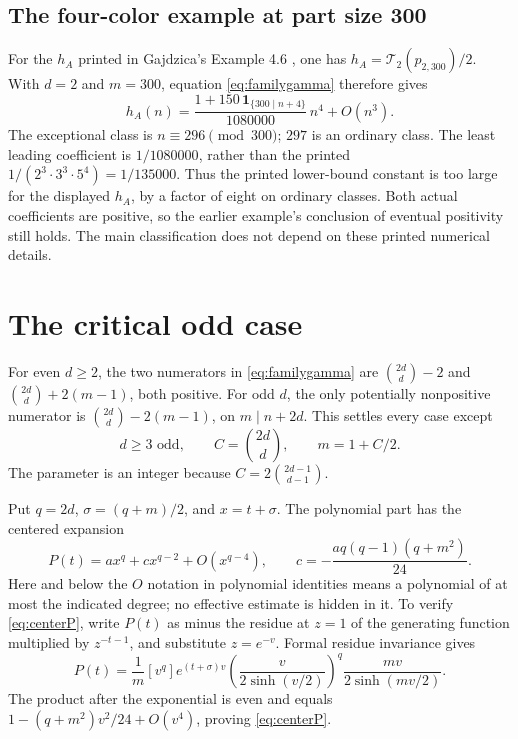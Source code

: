 \documentclass[11pt,reqno]{amsart}
\theoremstyle{remark}
\newcommand{\Lag}{\mathcal{T}}
\newcommand{\ind}{\mathbf{1}}
\begin{document}
\subsection{The four-color example at part size 300}\label{sec:example46}

For the \(h_A\) printed in Gajdzica's Example 4.6
\cite[Example 4.6]{Gajdzica_2024}, one has \(h_A=\Lag_2(p_{2,300})/2\).
With \(d=2\) and \(m=300\), equation \eqref{eq:familygamma} therefore gives
\[
 h_A(n)=
 \frac{1+150\,\ind_{\{300\mid n+4\}}}{1080000}\,n^4+O(n^3).
\]
The exceptional class is \(n\equiv296\pmod{300}\); \(297\) is an
ordinary class. The least leading coefficient is \(1/1080000\),
rather than the printed \(1/(2^3\cdot3^3\cdot5^4)=1/135000\).
Thus the printed lower-bound constant is too large for the displayed
\(h_A\), by a factor of eight on ordinary classes. Both actual
coefficients are positive, so the earlier example's conclusion of
eventual positivity still holds. The main classification does not
depend on these printed numerical details.

\section{The critical odd case}\label{sec:critical}

For even \(d\ge2\), the two numerators in \eqref{eq:familygamma} are
\(\binom{2d}{d}-2\) and \(\binom{2d}{d}+2(m-1)\), both positive.
For odd \(d\), the only potentially nonpositive numerator is
\(\binom{2d}{d}-2(m-1)\), on \(m\mid n+2d\).
This settles every case except
\begin{equation}\label{eq:critical}
 d\ge3\text{ odd},\qquad C=\binom{2d}{d},\qquad m=1+C/2.
\end{equation}
The parameter is an integer because \(C=2\binom{2d-1}{d-1}\).

Put \(q=2d\), \(\sigma=(q+m)/2\), and \(x=t+\sigma\). The polynomial part
has the centered expansion
\begin{equation}\label{eq:centerP}
 P(t)=ax^q+cx^{q-2}+O(x^{q-4}),\qquad
 c=-\frac{a q(q-1)(q+m^2)}{24}.
\end{equation}
Here and below the \(O\) notation in polynomial identities means a polynomial
of at most the indicated degree; no effective estimate is hidden in it.
To verify \eqref{eq:centerP}, write \(P(t)\) as minus the residue at \(z=1\)
of the generating function multiplied by \(z^{-t-1}\), and substitute
\(z=e^{-v}\). Formal residue invariance gives
\[
 P(t)=\frac1m[v^q]e^{(t+\sigma)v}
       \left(\frac{v}{2\sinh(v/2)}\right)^q
       \frac{mv}{2\sinh(mv/2)}.
\]
The product after the exponential is even and equals
\(1-(q+m^2)v^2/24+O(v^4)\), proving \eqref{eq:centerP}.
\end{document}
